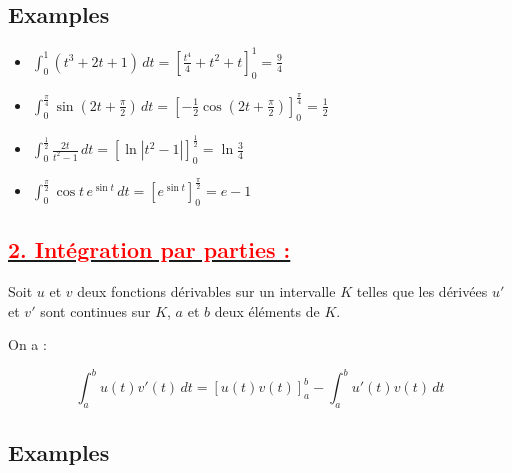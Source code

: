 \documentclass[12pt,a4paper]{article}
\begin{document}
\subsection*{Examples}

\begin{itemize}
    \item \( \int_0^1 \left( t^3 + 2t + 1 \right) \, dt = \left[ \frac{t^4}{4} + t^2 + t \right]_0^1 = \frac{9}{4} \)
    
    \item \( \int_0^{\frac{\pi}{4}} \sin \left( 2t + \frac{\pi}{2} \right) \, dt = \left[ -\frac{1}{2} \cos \left( 2t + \frac{\pi}{2} \right) \right]_0^{\frac{\pi}{4}} = \frac{1}{2} \)
    
    \item \( \int_0^{\frac{1}{2}} \frac{2t}{t^2 - 1} \, dt = \left[ \ln |t^2 - 1| \right]_0^{\frac{1}{2}} = \ln \frac{3}{4} \)
    
    \item \( \int_0^{\frac{\pi}{2}} \cos t \, e^{\sin t} \, dt = \left[ e^{\sin t} \right]_0^{\frac{\pi}{2}} = e - 1 \)
\end{itemize}
\subsection*{\underline{\textbf{\textcolor{red}{2. Intégration par parties : }}}}
Soit \( u \) et \( v \) deux fonctions dérivables sur un intervalle \( K \) telles que les dérivées \( u' \) et \( v' \) sont continues sur \( K \), \( a \) et \( b \) deux éléments de \( K \).

On a :

\[
\int_a^b u(t) v'(t) \, dt = \left[ u(t) v(t) \right]_a^b - \int_a^b u'(t) v(t) \, dt
\]

\subsection*{Examples}
\end{document}
